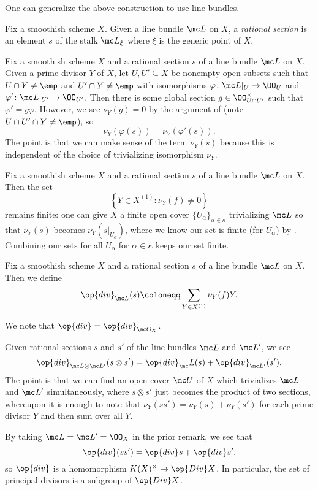 \documentclass[../notes.tex]{subfiles}
\begin{document}
One can generalize the above construction to use line bundles.
\begin{definition}
	Fix a smoothish scheme $X$. Given a line bundle $\mc L$ on $X$, a \textit{rational section} is an element $s$ of the stalk $\mc L_\xi$ where $\xi$ is the generic point of $X$.
\end{definition}
\begin{remark}
	Fix a smoothish scheme $X$ and a rational section $s$ of a line bundle $\mc L$ on $X$. Given a prime divisor $Y$ of $X$, let $U,U'\subseteq X$ be nonempty open subsets such that $U\cap Y\ne\emp$ and $U'\cap Y\ne\emp$ with isomorphisms $\varphi\colon\mc L|_U\to\OO_U$ and $\varphi'\colon\mc L|_{U'}\to\OO_{U'}$. Then there is some global section $g\in\OO_{U\cap U'}^\times$ such that $\varphi'=g\varphi$. However, we see $\nu_Y(g)=0$ by the argument of  (note $U\cap U'\cap Y\ne\emp$), so
	\[\nu_Y(\varphi(s))=\nu_Y(\varphi'(s)).\]
	The point is that we can make sense of the term $\nu_Y(s)$ because this is independent of the choice of trivializing isomorphism $\nu_Y$.
\end{remark}
\begin{remark}
	Fix a smoothish scheme $X$ and a rational section $s$ of a line bundle $\mc L$ on $X$. Then the set
	\[\left\{Y\in X^{(1)}:\nu_Y(f)\ne0\right\}\]
	remains finite: one can give $X$ a finite open cover $\{U_\alpha\}_{\alpha\in\kappa}$ trivializing $\mc L$ so that $\nu_Y(s)$ becomes $\nu_Y(s|_{U_\alpha})$, where we know our set is finite (for $U_\alpha$) by . Combining our sets for all $U_\alpha$ for $\alpha\in\kappa$ keeps our set finite.
\end{remark}
\begin{definition}
	Fix a smoothish scheme $X$ and a rational section $s$ of a line bundle $\mc L$ on $X$. Then we define
	\[\op{div}_{\mc L}(s)\coloneqq\sum_{Y\in X^{(1)}}\nu_Y(f)Y.\]
\end{definition}
\begin{example}
	We note that ${\op{div}}={\op{div}_{\mc O_X}}$.
\end{example}
\begin{remark}
	Given rational sections $s$ and $s'$ of the line bundles $\mc L$ and $\mc L'$, we see
	\[\op{div}_{\mc L\otimes\mc L'}(s\otimes s')=\op{div}_\mc L(s)+\op{div}_{\mc L'}(s').\]
	The point is that we can find an open cover $\mc U$ of $X$ which trivializes $\mc L$ and $\mc L'$ simultaneously, where $s\otimes s'$ just becomes the product of two sections, whereupon it is enough to note that $\nu_Y(ss')=\nu_Y(s)+\nu_Y(s')$ for each prime divisor $Y$ and then sum over all $Y$.
\end{remark}
\begin{example}
	By taking $\mc L=\mc L'=\OO_X$ in the prior remark, we see that
	\[\op{div}(ss')=\op{div}s+\op{div}s',\]
	so $\op{div}$ is a homomorphism $K(X)^\times\to\op{Div}X$. In particular, the set of principal divisors is a subgroup of $\op{Div}X$.
\end{example}
\end{document}
